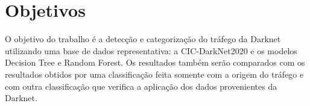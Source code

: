 \section{Objetivos}

O objetivo do trabalho é a detecção e categorização
do tráfego da Darknet utilizando uma base de dados
representativa: a CIC-DarkNet2020 e os modelos 
Decision Tree e Random Forest. Os resultados 
também serão comparados com os resultados obtidos 
por uma classificação feita somente com a origem 
do tráfego e com outra classificação que verifica
 a aplicação dos dados provenientes da Darknet.
